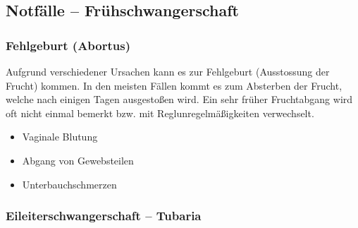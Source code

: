 \subsection{Notfälle -- Frühschwangerschaft}

\subsubsection{Fehlgeburt (Abortus)}



Aufgrund verschiedener Ursachen kann es zur Fehlgeburt (Ausstossung der Frucht)
kommen. In den meisten Fällen kommt es zum Absterben der Frucht, welche nach
einigen Tagen ausgestoßen wird. Ein sehr früher
Fruchtabgang wird oft nicht einmal bemerkt bzw. mit
Reglunregelmäßigkeiten verwechselt. 

\begin{itemize}
	\item Vaginale Blutung
	\item Abgang von Gewebsteilen
	\item Unterbauchschmerzen
\end{itemize}





\subsubsection{Eileiterschwangerschaft -- Tubaria}


